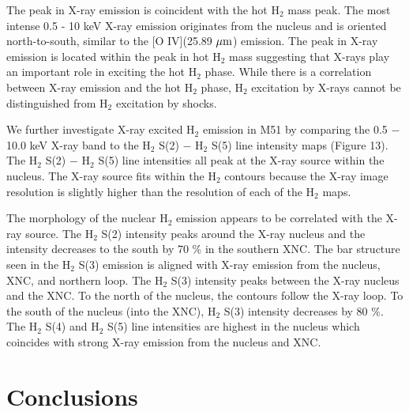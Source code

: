 \documentclass[manuscript]{aastex}
\begin{document}
The peak in X-ray emission is coincident with the hot $\mathrm{H_2}$ mass peak. The most intense 0.5 - 10 keV X-ray emission originates from the nucleus and is oriented north-to-south, similar to the [O IV](25.89 $\mbox{$\mu$m}$) emission.  The peak in X-ray emission is located within the peak in hot $\mathrm{H_2}$ mass suggesting that X-rays play an important role in exciting the hot $\mathrm{H_2}$ phase.  While there is a correlation between X-ray emission and the hot $\mathrm{H_2}$ phase, $\mathrm{H_2}$ excitation by X-rays cannot be distinguished from $\mathrm{H_2}$ excitation by shocks.  



We further investigate X-ray excited $\mathrm{H_2}$ emission in M51 by comparing the 0.5 $-$ 10.0 keV X-ray band to the $\mathrm{H_2}$ S(2) $-$ $\mathrm{H_2}$ S(5) line intensity maps (Figure 13).   The $\mathrm{H_2}$ S(2) $-$ $\mathrm{H_2}$ S(5) line intensities all peak at the X-ray source within the nucleus.  The X-ray source fits within the $\mathrm{H_2}$ contours because the X-ray image resolution is slightly higher than the resolution of each of the $\mathrm{H_2}$ maps.  

The morphology of the nuclear $\mathrm{H_2}$ emission appears to be correlated with the X-ray source.  The $\mathrm{H_2}$ S(2) intensity peaks around the X-ray nucleus and the intensity decreases to the south by 70 \% in the southern XNC.  The bar structure seen in the $\mathrm{H_2}$ S(3) emission is aligned with X-ray emission from the nucleus, XNC, and northern loop.  The $\mathrm{H_2}$ S(3) intensity peaks between the X-ray nucleus and the XNC.  To the north of the nucleus, the contours follow the X-ray loop.  To the south of the nucleus (into the XNC), $\mathrm{H_2}$ S(3) intensity decreases by 80 \%.  The $\mathrm{H_2}$ S(4) and $\mathrm{H_2}$ S(5) line intensities are highest in the nucleus which coincides with strong X-ray emission from the nucleus and XNC.

\section{Conclusions}
\end{document}

